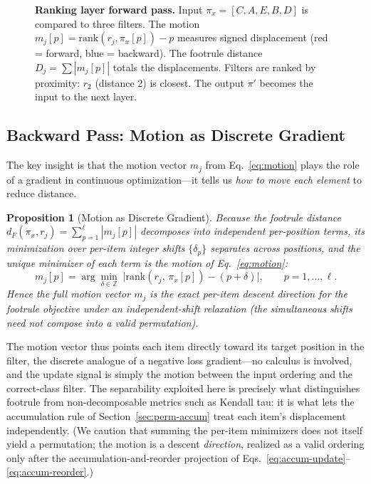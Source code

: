 \documentclass[12pt]{article}
\newcommand{\Z}{\mathbb{Z}}
\newcommand{\rankop}{\mathrm{rank}}
\newtheorem{proposition}[theorem]{Proposition}
\begin{document}
\begin{figure}[t]
{%
}
\caption{\textbf{Ranking layer forward pass.} Input $\pi_x = [C, A, E, B, D]$ is compared to three filters. The motion $m_j[p] = \mathrm{rank}(r_j, \pi_x[p]) - p$ measures signed displacement (red = forward, blue = backward). The footrule distance $D_j = \sum |m_j[p]|$ totals the displacements. Filters are ranked by proximity: $r_2$ (distance 2) is closest. The output $\pi'$ becomes the input to the next layer.}
\label{fig:forward-pass}
\end{figure}

\subsection{Backward Pass: Motion as Discrete Gradient}

The key insight is that the motion vector $m_j$ from Eq.~\eqref{eq:motion} plays the role of a gradient in continuous optimization---it tells us \emph{how to move each element} to reduce distance.

\begin{proposition}[Motion as Discrete Gradient]
\label{prop:motion-gradient}
Because the footrule distance $d_F(\pi_x, r_j) = \sum_{p=1}^\ell |m_j[p]|$ decomposes into independent per-position terms, its minimization over per-item integer shifts $\{\delta_p\}$ separates across positions, and the unique minimizer of each term is the motion of Eq.~\eqref{eq:motion}:
\[
m_j[p] = \arg\min_{\delta \in \Z}\; \big|\rankop(r_j,\, \pi_x[p]) - (p + \delta)\big|, \qquad p = 1, \dots, \ell.
\]
Hence the full motion vector $m_j$ is the exact per-item descent direction for the footrule objective under an independent-shift relaxation (the simultaneous shifts need not compose into a valid permutation).
\end{proposition}

The motion vector thus points each item directly toward its target position in the filter, the discrete analogue of a negative loss gradient---no calculus is involved, and the update signal is simply the motion between the input ordering and the correct-class filter. The separability exploited here is precisely what distinguishes footrule from non-decomposable metrics such as Kendall tau: it is what lets the accumulation rule of Section~\ref{sec:perm-accum} treat each item's displacement independently. (We caution that summing the per-item minimizers does not itself yield a permutation; the motion is a descent \emph{direction}, realized as a valid ordering only after the accumulation-and-reorder projection of Eqs.~\ref{eq:accum-update}--\ref{eq:accum-reorder}.)
\end{document}

